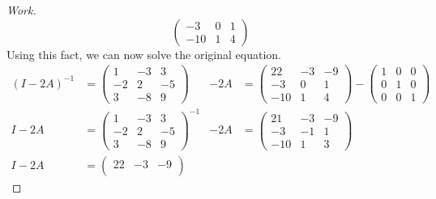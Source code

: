 \documentclass{article}
\begin{document}
\begin{proof}[Work]
\[\begin{pmatrix}
      -3  & 0  & 1  \\
      -10 & 1  & 4
    \end{pmatrix}
  \]
  Using this fact, we can now solve the original equation.
  \begin{align*}
    (I - 2A)^{-1} & = \begin{pmatrix}
                        1  & -3 & 3  \\
                        -2 & 2  & -5 \\
                        3  & -8 & 9
                      \end{pmatrix}  & -2A & =  \begin{pmatrix}
                                                  22  & -3 & -9 \\
                                                  -3  & 0  & 1  \\
                                                  -10 & 1  & 4
                                                \end{pmatrix} - \begin{pmatrix}
                                                                  1 & 0 & 0 \\
                                                                  0 & 1 & 0 \\
                                                                  0 & 0 & 1
                                                                \end{pmatrix}               \\
    I - 2A        & = \begin{pmatrix}
                        1  & -3 & 3  \\
                        -2 & 2  & -5 \\
                        3  & -8 & 9
                      \end{pmatrix}^{-1} & -2A & = \begin{pmatrix}
                                                     21  & -3 & -9 \\
                                                     -3  & -1 & 1  \\
                                                     -10 & 1  & 3
                                                   \end{pmatrix}                            \\
    I - 2A        & = \begin{pmatrix}
                        22  & -3 & -9 \\

\end{pmatrix}
\end{align*}
\end{proof}
\end{document}
